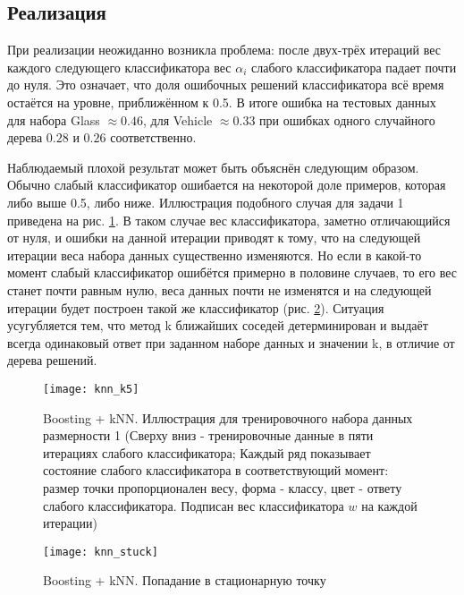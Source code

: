 \documentclass[a4paper,12pt]{article} %
\newcommand{\myPictWidth}{.95\textwidth}
\begin{document}
\subsection{Реализация}
При реализации неожиданно возникла проблема: после двух-трёх итераций вес каждого следующего классификатора вес $\alpha_i$ слабого классификатора падает почти до нуля. Это означает, что доля ошибочных решений классификатора всё время остаётся на уровне, приближённом к 0.5. В итоге ошибка на тестовых данных для набора Glass $\approx 0.46$, для Vehicle $\approx 0.33$ при ошибках одного случайного дерева $0.28$ и $0.26$ соответственно.

Наблюдаемый плохой результат может быть объяснён следующим образом. Обычно слабый классификатор ошибается на некоторой доле примеров, которая либо выше 0.5, либо ниже. Иллюстрация подобного случая для задачи 1 приведена на рис. \ref{fig:boosting_k2}. В таком случае вес классификатора, заметно отличающийся от нуля, и ошибки на данной итерации приводят к тому, что на следующей итерации веса набора данных существенно изменяются. Но если в какой-то момент слабый классификатор ошибётся примерно в половине случаев, то его вес станет почти равным нулю, веса данных почти не изменятся и на следующей итерации будет построен такой же классификатор (рис. \ref{fig:boosting_stuck}). Ситуация усугубляется тем, что метод k ближайших соседей детерминирован и выдаёт всегда одинаковый ответ при заданном наборе данных и значении k, в отличие от дерева решений.

\begin{figure}[H]
	\centering \texttt{[image: knn\_k5]}
	\caption{Boosting + kNN. Иллюстрация для тренировочного набора данных размерности 1 (Сверху вниз - тренировочные данные в пяти итерациях слабого классификатора; Каждый ряд показывает состояние слабого классификатора в соответствующий момент: размер точки пропорционален весу, форма - классу, цвет - ответу слабого классификатора. Подписан вес классификатора $w$ на каждой итерации)}
	\label{fig:boosting_k2}
\end{figure}

\begin{figure}[H]
	\centering \texttt{[image: knn\_stuck]}
	\caption{Boosting + kNN. Попадание в стационарную точку}
	\label{fig:boosting_stuck}
\end{figure}

\newpage
\end{document}
